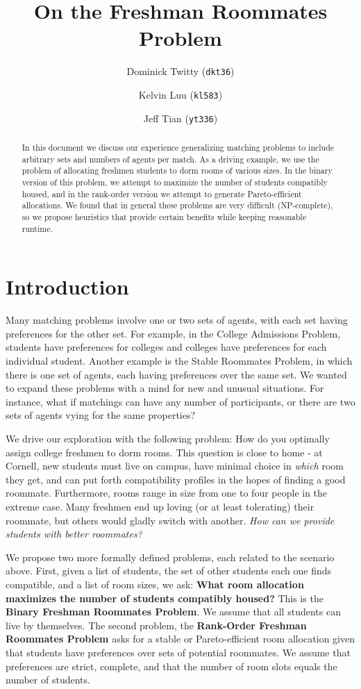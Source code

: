 \documentclass[12pt]{article}
\title{On the Freshman Roommates Problem}
\author{Dominick Twitty (\texttt{dkt36})\\
\and Kelvin Luu (\texttt{kl583})\\
\and Jeff Tian (\texttt{yt336})
}
\date{}
\begin{document}
\maketitle

\begin{abstract}
In this document we discuss our experience generalizing matching problems to include arbitrary sets and numbers of agents per match. As a driving example, we use the problem of allocating freshmen students to dorm rooms of various sizes. In the binary version of this problem, we attempt to maximize the number of students compatibly housed, and in the rank-order version we attempt to generate Pareto-efficient allocations. We found that in general these problems are very difficult (NP-complete), so we propose heuristics that provide certain benefits while keeping reasonable runtime.  
\end{abstract}

\section*{Introduction}
Many matching problems involve one or two sets of agents, with each set having preferences for the other set. For example, in the College Admissions Problem, students have preferences for colleges and colleges have preferences for each individual student. Another example is the Stable Roommates Problem, in which there is one set of agents, each having preferences over the same set. We wanted to expand these problems with a mind for new and unusual situations. For instance, what if matchings can have any number of participants, or there are two sets of agents vying for the same properties?

We drive our exploration with the following problem: How do you optimally assign college freshmen to dorm rooms. This question is close to home - at Cornell, new students must live on campus, have minimal choice in \textit{which} room they get, and can put forth compatibility profiles in the hopes of finding a good roommate. Furthermore, rooms range in size from one to four people in the extreme case. Many freshmen end up loving (or at least tolerating) their roommate, but others would gladly switch with another. \textit{How can we provide students with better roommates?}

We propose two more formally defined problems, each related to the scenario above. First, given a list of students, the set of other students each one finds compatible, and a list of room sizes, we ask: \textbf{What room allocation maximizes the number of students compatibly housed?} This is the \textbf{Binary Freshman Roommates Problem}. We assume that all students can live by themselves. The second problem, the \textbf{Rank-Order Freshman Roommates Problem} asks for a stable or Pareto-efficient room allocation given that students have preferences over sets of potential roommates. We assume that preferences are strict, complete, and that the number of room slots equals the number of students.
\end{document}

